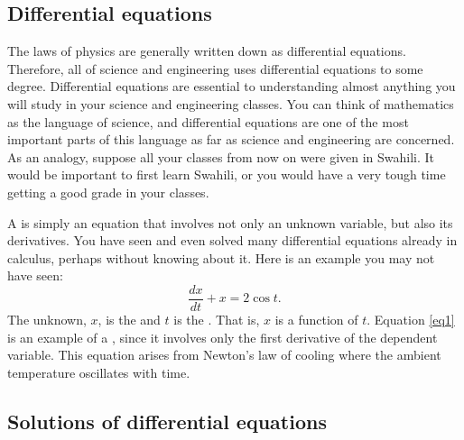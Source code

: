 
\subsection{Differential equations}

The laws of physics are generally written down as differential
equations.  Therefore, all of science and engineering uses
differential equations to some degree.
Differential equations are essential to understanding almost anything you will
study in your science and engineering classes.
You can think of mathematics as the language of science, and
differential equations are one of the most important parts of this
language as far as science and engineering are concerned.  As an analogy,
suppose all your classes from now on were given in Swahili.
It would be important to first learn Swahili, or you would have a very
tough time getting a good grade in your classes.

A \emph{} is simply an equation that involves
not only an unknown variable, but also its derivatives.
You have seen and even solved many
differential equations already in calculus, perhaps without knowing about it.
Here is an example you may not have seen:
\begin{equation} \label{eq1}
\frac{dx}{dt} + x = 2 \cos t .
\end{equation}
The unknown, $x$, is the \emph{} and $t$ is the
\emph{}.  That is, $x$ is a function of $t$.
Equation \eqref{eq1}
is an example of a \emph{}, since
it involves only the first derivative of the dependent variable.  This
equation arises from Newton's law of cooling where the ambient
temperature oscillates with time.

\subsection{Solutions of differential equations}

